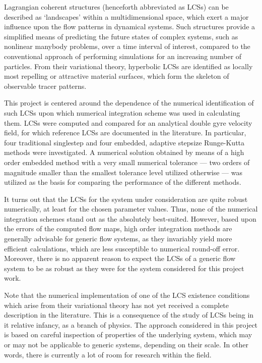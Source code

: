 Lagrangian coherent structures (henceforth abbreviated as LCSs) can be described
as `landscapes' within a multidimensional space, which exert a major influence
upon the flow patterns in dynamical systems. Such structures provide a
simplified means of predicting the future states of complex systems, such as
nonlinear manybody problems, over a time interval of interest, compared to the
conventional approach of performing simulations for an increasing number of
particles. From their variational theory, hyperbolic LCSs are identified as
locally most repelling or attractive material surfaces, which form the skeleton
of observable tracer patterns.

This project is centered around the dependence of the numerical identification
of such LCSs upon which numerical integration scheme was used in calculating
them. LCSs were computed and compared for an analytical double gyre velocity
field, for which reference LCSs are documented in the literature. In particular,
four traditional singlestep and four embedded, adaptive
stepsize Runge-Kutta methods were investigated.
A numerical solution obtained by means of a high order embedded method with
a very small numerical tolerance --- two orders of magnitude smaller than the
smallest tolerance level utilized otherwise --- was utilized as the basis
for comparing the performance of the different methods.

It turns out that the LCSs for the system under consideration are quite robust
numerically, at least for the chosen parameter values. Thus, none of the
numerical integration schemes stand out as the absolutely best-suited. However,
based upon the errors of the computed flow maps, high order integration
methods are generally advisable for generic flow systems, as they invariably
yield more efficient calculations, which are less susceptible to numerical
round-off error. Moreover, there is no apparent reason to expect the LCSs of
a generic flow system to be as robust as they were for the system considered
for this project work.

Note that the numerical implementation of one of the LCS existence conditions
which arise from their variational theory has not yet received a complete
description in the literature. This is a consequence of the study of LCSs
being in it relative infancy, as a branch of physics. The approach
considered in this project is based on careful inspection of properties of the
underlying system, which may or may not be applicable to generic systems,
depending on their scale. In other words, there is currently a lot of room for
research within the field.

